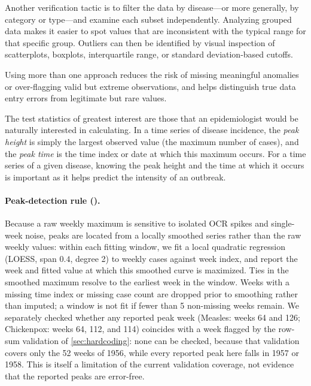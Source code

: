 \documentclass[12pt]{article}
\begin{document}
Another verification tactic is to filter the data by disease---or more generally, by category or type---and examine each subset independently. Analyzing grouped data makes it easier to spot values that are inconsistent with the typical range for that specific group. Outliers can then be identified by visual inspection of scatterplots, boxplots, interquartile range, or standard deviation-based cutoffs.

Using more than one approach reduces the risk of missing meaningful anomalies or over-flagging valid but extreme observations, and helps distinguish true data entry errors from legitimate but rare values.

The test statistics of greatest interest are those that an epidemiologist would be naturally interested in calculating. In a time series of disease incidence, the \emph{peak height} is simply the largest observed value (the maximum number of cases), and the \emph{peak time} is the time index or date at which this maximum occurs. For a time series of a given disease, knowing the peak height and the time at which it occurs is important as it helps predict the intensity of an outbreak.

\paragraph{Peak-detection rule ().} Because a raw weekly maximum is sensitive to isolated OCR spikes and single-week noise, peaks are located from a locally smoothed series rather than the raw weekly values: within each fitting window, we fit a local quadratic regression (LOESS, span $0.4$, degree 2) to weekly cases against week index, and report the week and fitted value at which this smoothed curve is maximized. Ties in the smoothed maximum resolve to the earliest week in the window. Weeks with a missing time index or missing case count are dropped prior to smoothing rather than imputed; a window is not fit if fewer than 5 non-missing weeks remain. We separately checked whether any reported peak week (Measles: weeks 64 and 126; Chickenpox: weeks 64, 112, and 114) coincides with a week flagged by the row-sum validation of \cref{sec:hardcoding}: none can be checked, because that validation covers only the 52 weeks of 1956, while every reported peak here falls in 1957 or 1958. This is itself a limitation of the current validation coverage, not evidence that the reported peaks are error-free.
\end{document}
